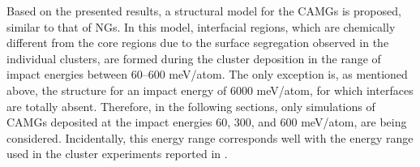 \begin{selfcite}
Based on the presented results, a structural model for the CAMGs is proposed, similar to that of NGs. In this model, interfacial regions, which are chemically different from the core regions due to the surface segregation observed in the individual clusters, are formed during the cluster deposition in the range of impact energies between 60–600 meV/atom. The only exception is, as mentioned above, the structure for an impact energy of 6000 meV/atom, for which interfaces are totally absent. Therefore, in the following sections, only simulations of CAMGs deposited at the impact energies 60, 300, and 600 meV/atom, are being considered. Incidentally, this energy range corresponds well with the energy range used in the cluster experiments reported in \cite{Benel2019}.
\end{selfcite}